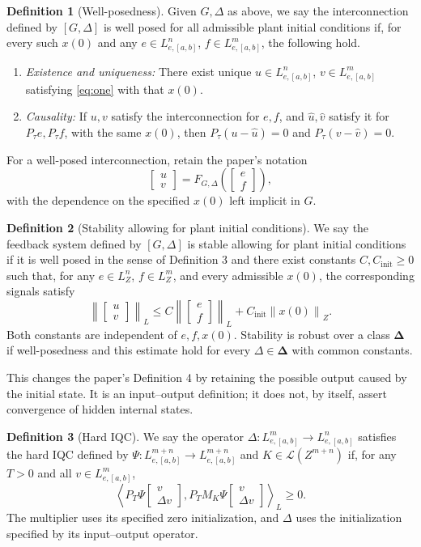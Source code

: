 \documentclass[10pt,twocolumn,letterpaper]{article}
\theoremstyle{definition}
\newtheorem{definition}{Definition}
\theoremstyle{plain}
\newcommand{\col}[1]{\begin{bmatrix}#1\end{bmatrix}}
\newcommand{\ip}[2]{\left\langle #1,#2\right\rangle}
\newcommand{\norm}[1]{\left\lVert #1\right\rVert}
\begin{document}
\begin{definition}[Well-posedness]
Given $G,\Delta$ as above, we say the interconnection defined by
$[G,\Delta]$ is well posed for all admissible plant initial conditions if,
for every such $x(0)$ and any $e\in L^n_{e,[a,b]}$,
$f\in L^m_{e,[a,b]}$, the following hold.
\begin{enumerate}
\item \emph{Existence and uniqueness:} There exist unique
$u\in L^n_{e,[a,b]}$, $v\in L^m_{e,[a,b]}$ satisfying
\eqref{eq:one} with that $x(0)$.
\item \emph{Causality:} If $u,v$ satisfy the interconnection for $e,f$,
and $\hat u,\hat v$ satisfy it for $P_\tau e,P_\tau f$, with the same
$x(0)$, then $P_\tau(u-\hat u)=0$ and $P_\tau(v-\hat v)=0$.
\end{enumerate}
\end{definition}

For a well-posed interconnection, retain the paper's notation
\[
 \col{u\\v}=F_{G,\Delta}\left(\col{e\\f}\right),
\]
with the dependence on the specified $x(0)$ left implicit in $G$.

\begin{definition}[Stability allowing for plant initial conditions]
We say the feedback system defined by $[G,\Delta]$ is stable allowing
for plant initial conditions if it is well posed in the sense of
Definition 3 and there exist constants $C,C_{\mathrm{init}}\geq0$ such
that, for any $e\in L^n_Z$, $f\in L^m_Z$, and every admissible $x(0)$,
the corresponding signals satisfy
\[
 \norm{\col{u\\v}}_L
 \leq C\norm{\col{e\\f}}_L+C_{\mathrm{init}}\norm{x(0)}_Z.
\]
Both constants are independent of $e,f,x(0)$. Stability is robust over
a class $\boldsymbol\Delta$ if well-posedness and this estimate hold
for every $\Delta\in\boldsymbol\Delta$ with common constants.
\end{definition}

This changes the paper's Definition 4 by retaining the possible output
caused by the initial state. It is an input--output definition; it does
not, by itself, assert convergence of hidden internal states.

\begin{definition}[Hard IQC]
We say the operator $\Delta:L^m_{e,[a,b]}\to L^n_{e,[a,b]}$ satisfies
the hard IQC defined by
$\Psi:L^{m+n}_{e,[a,b]}\to L^{m+n}_{e,[a,b]}$ and
$K\in\mathcal L(Z^{m+n})$ if, for any $T>0$ and all
$v\in L^m_{e,[a,b]}$,
\begin{equation}\label{eq:two}
 \ip{P_T\Psi\col{v\\\Delta v}}{
     P_TM_K\Psi\col{v\\\Delta v}}_L\geq0.
\end{equation}
The multiplier uses its specified zero initialization, and $\Delta$
uses the initialization specified by its input--output operator.
\end{definition}
\end{document}
